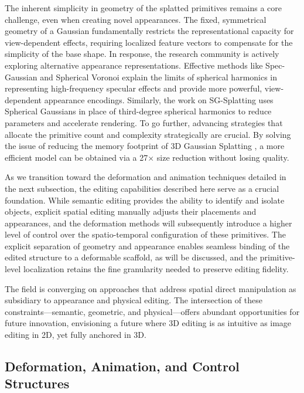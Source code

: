 \documentclass[11pt,a4paper]{article}
\begin{document}
The inherent simplicity in geometry of the splatted primitives remains a core challenge, even when creating novel appearances. The fixed, symmetrical geometry of a Gaussian fundamentally restricts the representational capacity for view-dependent effects, requiring localized feature vectors to compensate for the simplicity of the base shape. In response, the research community is actively exploring alternative appearance representations. Effective methods like Spec-Gaussian \cite{arxiv:2402.15870v1} and Spherical Voronoi \cite{arxiv:2512.14180v2} explain the limits of spherical harmonics in representing high-frequency specular effects and provide more powerful, view-dependent appearance encodings. Similarly, the work on SG-Splatting \cite{arxiv:2501.00342v1} uses Spherical Gaussians in place of third-degree spherical harmonics to reduce parameters and accelerate rendering. To go further, advancing strategies that allocate the primitive count and complexity strategically are crucial. By solving the issue of reducing the memory footprint of 3D Gaussian Splatting \cite{arxiv:2406.17074v1}, a more efficient model can be obtained via a 27$\times$ size reduction without losing quality.

As we transition toward the deformation and animation techniques detailed in the next subsection, the editing capabilities described here serve as a crucial foundation. While semantic editing provides the ability to identify and isolate objects, explicit spatial editing manually adjusts their placements and appearances, and the deformation methods will subsequently introduce a higher level of control over the spatio-temporal configuration of these primitives. The explicit separation of geometry and appearance enables seamless binding of the edited structure to a deformable scaffold, as will be discussed, and the primitive-level localization retains the fine granularity needed to preserve editing fidelity.

The field is converging on approaches that address spatial direct manipulation as subsidiary to appearance and physical editing. The intersection of these constraints---semantic, geometric, and physical---offers abundant opportunities for future innovation, envisioning a future where 3D editing is as intuitive as image editing in 2D, yet fully anchored in 3D.


\subsection{Deformation, Animation, and Control Structures}
\end{document}
